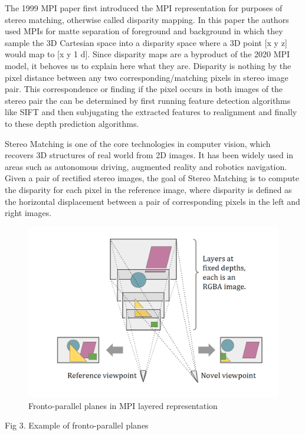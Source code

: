The 1999 MPI paper first introduced the MPI representation for purposes of stereo matching, otherwise called disparity mapping. In this paper the authors used MPIs for matte separation of foreground and background in which they sample the 3D Cartesian space into a disparity space where a 3D point [x y z] would map to [x y 1 d]. Since disparity maps are a byproduct of the 2020 MPI model, it behoves us to explain here what they are. Disparity is nothing by the pixel distance between any two corresponding/matching pixels in stereo image pair. This correspondence or finding if the pixel occurs in both images of the stereo pair the can be determined by first running feature detection algorithms like SIFT and then subjugating the extracted features to realignment and finally to these depth prediction algorithms.

Stereo Matching is one of the core technologies in computer vision, which recovers 3D structures of real world from 2D images. It has been widely used in areas such as autonomous driving, augmented reality and robotics navigation. Given a pair of rectified stereo images, the goal of Stereo Matching is to compute the disparity for each pixel in the reference image, where disparity is defined as the horizontal displacement between a pair of corresponding pixels in the left and right images.
    
\begin{figure}[!h]
    \includegraphics[width=1\columnwidth]{figures/mpi-layered-representation.png}
    \caption{Fronto-parallel planes in MPI layered representation}
    \label{fig:mpi-layered-representation}
\end{figure}
Fig 3. Example of fronto-parallel planes

